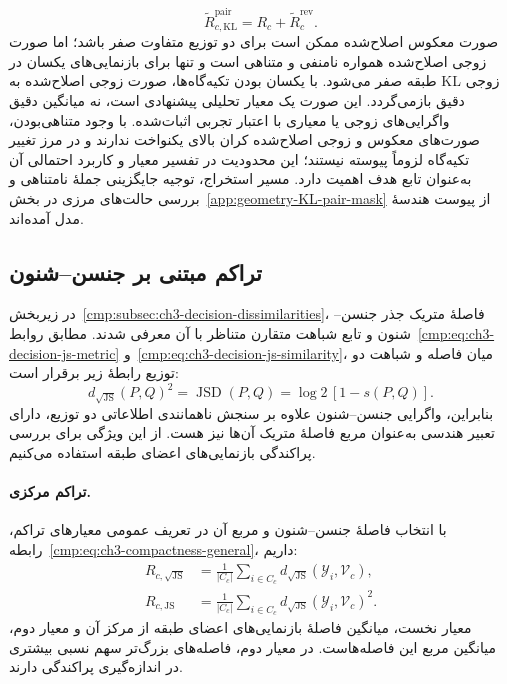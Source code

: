 \begin{equation}\label{cmp:eq:ch3-KL-mask-corrected-pair}
\boxed{\widetilde R_{c,\mathrm{KL}}^{\mathrm{pair}}
=R_c+\widetilde R_c^{\mathrm{rev}}.}
\end{equation}
صورت معکوس اصلاح‌شده ممکن است برای دو توزیع متفاوت
صفر باشد؛ اما صورت زوجی اصلاح‌شده همواره نامنفی و
متناهی است و تنها برای بازنمایی‌های یکسان در طبقه
صفر می‌شود. با یکسان بودن تکیه‌گاه‌ها، صورت زوجی
اصلاح‌شده به KL زوجی دقیق بازمی‌گردد. این صورت یک
معیار تحلیلی پیشنهادی است، نه میانگین دقیق
واگرایی‌های زوجی یا معیاری با اعتبار تجربی اثبات‌شده.
با وجود متناهی‌بودن، صورت‌های معکوس و زوجی
اصلاح‌شده کران بالای یکنواخت ندارند و در مرز
تغییر تکیه‌گاه لزوماً پیوسته نیستند؛ این محدودیت
در تفسیر معیار و کاربرد احتمالی آن به‌عنوان
تابع هدف اهمیت دارد.
مسیر استخراج، توجیه جایگزینی جملهٔ نامتناهی و
بررسی حالت‌های مرزی در بخش~\ref{app:geometry-KL-pair-mask}
از پیوست هندسهٔ مدل آمده‌اند.

\subsection{تراکم مبتنی بر جنسن--شنون}
\label{cmp:subsec:ch3-compactness-JS}

در زیربخش~\ref{cmp:subsec:ch3-decision-dissimilarities}،
فاصلهٔ متریک جذر جنسن--شنون و تابع شباهت متقارن
متناظر با آن معرفی شدند. مطابق
روابط~\eqref{cmp:eq:ch3-decision-js-metric}
و~\eqref{cmp:eq:ch3-decision-js-similarity}، میان فاصله
و شباهت دو توزیع رابطهٔ زیر برقرار است:
\begin{equation}\label{cmp:eq:ch3-js-compactness-distance-similarity}
d_{\sqrt{\mathrm{JS}}}(P,Q)^2
=\operatorname{JSD}(P,Q)=\log 2\,[1-s(P,Q)].
\end{equation}
بنابراین، واگرایی جنسن--شنون علاوه بر سنجش
ناهمانندی اطلاعاتی دو توزیع، دارای تعبیر هندسی
به‌عنوان مربع فاصلهٔ متریک آن‌ها نیز هست.
از این ویژگی برای بررسی پراکندگی بازنمایی‌های
اعضای طبقه استفاده می‌کنیم.

\paragraph{تراکم مرکزی.}
با انتخاب فاصلهٔ جنسن--شنون و مربع آن در تعریف عمومی
معیارهای تراکم، رابطه~\eqref{cmp:eq:ch3-compactness-general}،
داریم:
\begin{equation}\label{cmp:eq:ch3-R-JS-central}
\begin{aligned}
R_{c,\sqrt{\mathrm{JS}}}
&=\frac1{|C_c|}\sum_{i\in C_c}
d_{\sqrt{\mathrm{JS}}}(\mathscr Y_i,\mathcal V_c),\\
R_{c,\mathrm{JS}}
&=\frac1{|C_c|}\sum_{i\in C_c}
d_{\sqrt{\mathrm{JS}}}(\mathscr Y_i,\mathcal V_c)^2.
\end{aligned}
\end{equation}
معیار نخست، میانگین فاصلهٔ بازنمایی‌های اعضای طبقه
از مرکز آن و معیار دوم، میانگین مربع این فاصله‌هاست.
در معیار دوم، فاصله‌های بزرگ‌تر سهم نسبی بیشتری
در اندازه‌گیری پراکندگی دارند.

